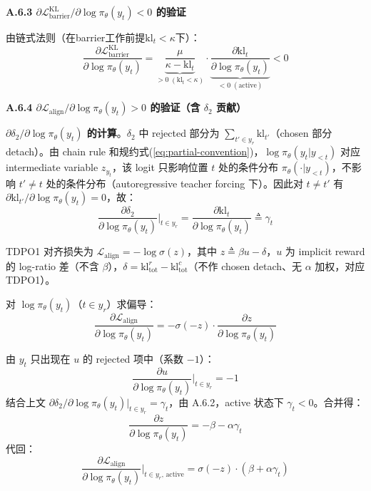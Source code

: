 \documentclass[lettersize,journal]{IEEEtran}
\begin{document}
\textbf{A.6.3 $\partial \mathcal{L}^{\text{KL}}_{\text{barrier}}/\partial \log\pi_\theta(y_t) < 0$ 的验证}

由链式法则（在barrier工作前提$\text{kl}_t < \kappa$下）：
\begin{equation}
\frac{\partial \mathcal{L}^{\text{KL}}_{\text{barrier}}}{\partial \log\pi_\theta(y_t)} = \underbrace{\frac{\mu}{\kappa - \text{kl}_t}}_{>0\;(\text{kl}_t<\kappa)} \cdot \underbrace{\frac{\partial \text{kl}_t}{\partial \log\pi_\theta(y_t)}}_{<0\;(\text{active})} < 0
\end{equation}

\textbf{A.6.4 $\partial \mathcal{L}_{\text{align}}/\partial \log\pi_\theta(y_t) > 0$ 的验证（含 $\delta_2$ 贡献）}

\textbf{$\partial \delta_2/\partial \log\pi_\theta(y_t)$ 的计算}。$\delta_2$ 中 rejected 部分为 $\sum_{t' \in y_r} \text{kl}_{t'}$（chosen 部分 detach）。由 chain rule 和规约式(\ref{eq:partial-convention})，$\log\pi_\theta(y_t|y_{<t})$ 对应 intermediate variable $z_{y_t}$，该 logit 只影响位置 $t$ 处的条件分布 $\pi_\theta(\cdot|y_{<t})$，不影响 $t' \neq t$ 处的条件分布（autoregressive teacher forcing 下）。因此对 $t \neq t'$ 有 $\partial \text{kl}_{t'}/\partial \log\pi_\theta(y_t) = 0$，故：
\begin{equation}
\frac{\partial \delta_2}{\partial \log\pi_\theta(y_t)}\bigg|_{t\in y_r} = \frac{\partial \text{kl}_t}{\partial \log\pi_\theta(y_t)} \triangleq \gamma_t
\end{equation}

TDPO1 对齐损失为 $\mathcal{L}_{\text{align}} = -\log\sigma(z)$，其中 $z \triangleq \beta u - \delta$，$u$ 为 implicit reward 的 log-ratio 差（不含 $\beta$），$\delta = \text{kl}^r_{\text{tot}} - \text{kl}^c_{\text{tot}}$（不作 chosen detach、无 $\alpha$ 加权，对应 TDPO1）。

对 $\log\pi_\theta(y_t)$（$t \in y_r$）求偏导：
\begin{equation}
\frac{\partial \mathcal{L}_{\text{align}}}{\partial \log\pi_\theta(y_t)} = -\sigma(-z) \cdot \frac{\partial z}{\partial \log\pi_\theta(y_t)}
\end{equation}

由 $y_t$ 只出现在 $u$ 的 rejected 项中（系数 $-1$）：
\begin{equation}
\frac{\partial u}{\partial \log\pi_\theta(y_t)}\bigg|_{t\in y_r} = -1
\end{equation}
结合上文 $\partial \delta_2/\partial \log\pi_\theta(y_t)|_{t\in y_r} = \gamma_t$，由 A.6.2，active 状态下 $\gamma_t < 0$。合并得：
\begin{equation}
\frac{\partial z}{\partial \log\pi_\theta(y_t)} = -\beta - \alpha\gamma_t
\end{equation}
代回：
\begin{equation}\label{eq:dL-align-full}
\frac{\partial \mathcal{L}_{\text{align}}}{\partial \log\pi_\theta(y_t)}\bigg|_{t \in y_r,\,\text{active}} = \sigma(-z) \cdot (\beta + \alpha\gamma_t)
\end{equation}
\end{document}
